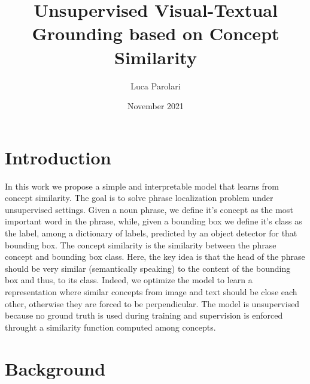 \documentclass{article}
\title{Unsupervised Visual-Textual Grounding based on Concept Similarity}
\author{Luca Parolari}
\date{November 2021}
\begin{document}
\maketitle

\section{Introduction}

In this work we propose a simple and interpretable model that learns
from concept similarity. The goal is to solve phrase localization
problem under unsupervised settings. Given a noun phrase, we define
it's concept as the most important word in the phrase, while, given a
bounding box we define it's class as the label, among a dictionary of
labels, predicted by an object detector for that bounding box. The
concept similarity is the similarity between the phrase concept and
bounding box class. Here, the key idea is that the head of the phrase
should be very similar (semantically speaking) to the content of the
bounding box and thus, to its class. Indeed, we optimize the model to
learn a representation where similar concepts from image and text
should be close each other, otherwise they are forced to be
perpendicular. The model is unsupervised because no ground truth is
used during training and supervision is enforced throught a similarity
function computed among concepts.


\section{Background}
\end{document}
